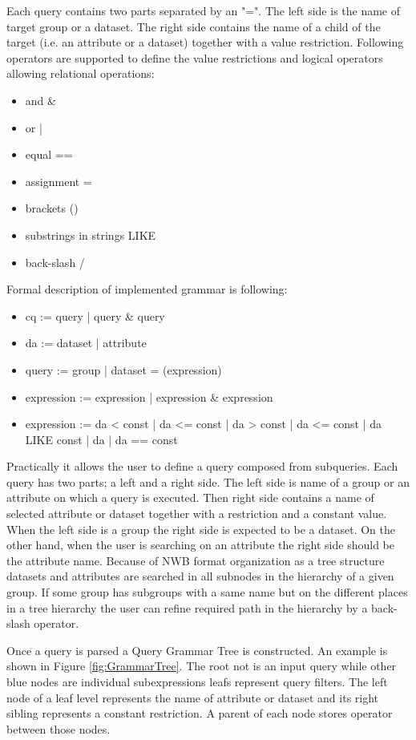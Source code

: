 \documentclass[utf8]{frontiersSCNS} %
\begin{document}
Each query contains two parts separated by an "=". The left side is the name of target group or a dataset. The right side contains the name of a child of the target (i.e. an attribute or a dataset) together with a value restriction. Following operators are supported to define the value restrictions and logical operators allowing relational operations:

\begin{itemize}
 \item and \&
 \item or  |
 \item equal ==
 \item assignment =
 \item brackets ()
 \item substrings in strings LIKE
 \item back-slash /
\end{itemize}

Formal description of implemented grammar is following:

\begin{itemize}
\item cq := query | query \& query
\item da := dataset | attribute
\item query := group | dataset = (expression)
\item expression := expression | expression \& expression
\item expression := da < const | da <= const | da > const | da <= const | da LIKE const | da | da == const 
\end{itemize}

Practically it allows the user to define a query composed from subqueries. Each query has two parts; a left and a right side. The left side is name of a group or an attribute on which a query is executed. Then right side contains a name of selected attribute or dataset together with a restriction and a constant value. When the left side is a group the right side is  expected to be a dataset. On the other hand, when the user is searching on an attribute the right side should be the attribute name. Because of NWB format organization as a tree structure datasets and attributes are searched in all subnodes in the hierarchy of a given group. If some group has subgroups with a same name but on the different places in a tree hierarchy the user can refine required path in the hierarchy by a back-slash operator.

Once a query is parsed a Query Grammar Tree is constructed. An example is shown in Figure \ref{fig:GrammarTree}. The root not is an input query while other blue nodes are individual subexpressions leafs represent query filters. The left node of a leaf level represents the name of attribute or dataset and its right sibling represents a constant restriction. A parent of each node stores operator between those nodes.
\end{document}
